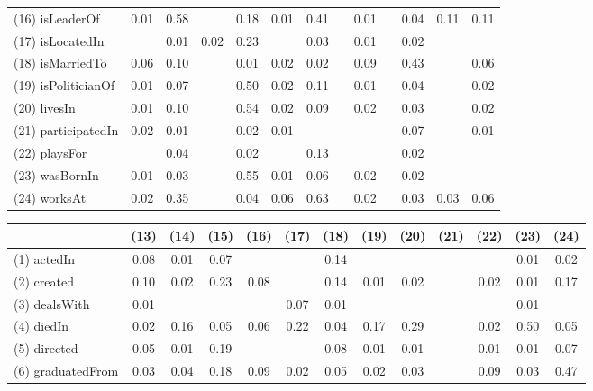 \begin{table}[t]
\begin{center}
\begin{tabular}{l||*{12}{c}}
            (16) isLeaderOf  & 0.01  & 0.58  &    & 0.18  & 0.01  & 0.41  &    & 0.01  &    & 0.04  & 0.11  & 0.11 \\
            (17) isLocatedIn  &    & 0.01  & 0.02  & 0.23  &    & 0.03  &    & 0.01  &    & 0.02  &    &   \\
            (18) isMarriedTo  & 0.06  & 0.10  &    & 0.01  & 0.02  & 0.02  &    & 0.09  &    & 0.43  &    & 0.06 \\
            (19) isPoliticianOf  & 0.01  & 0.07  &    & 0.50  & 0.02  & 0.11  &    & 0.01  &    & 0.04  &    & 0.02 \\
            (20) livesIn  & 0.01  & 0.10  &    & 0.54  & 0.02  & 0.09  &    & 0.02  &    & 0.03  &    & 0.02 \\
            (21) participatedIn  & 0.02  & 0.01  &    & 0.02  & 0.01  &    &    &    &    & 0.07  &    & 0.01 \\
            (22) playsFor  &    & 0.04  &    & 0.02  &    & 0.13  &    &    &    & 0.02  &    &   \\
            (23) wasBornIn  & 0.01  & 0.03  &    & 0.55  & 0.01  & 0.06  &    & 0.02  &    & 0.02  &    &   \\
            (24) worksAt  & 0.02  & 0.35  &    & 0.04  & 0.06  & 0.63  &    & 0.02  &    & 0.03  & 0.03  & 0.06 \\
        \end{tabular}
        \begin{tabular}{l||*{12}{c}}
                   & (13) & (14) & (15) & (16) & (17) & (18) & (19) & (20) & (21) & (22) & (23) & (24) \\
            \hline
            (1) actedIn  & 0.08  & 0.01  & 0.07  &    &    & 0.14  &    &    &    &    & 0.01  & 0.02 \\
            (2) created  & 0.10  & 0.02  & 0.23  & 0.08  &    & 0.14  & 0.01  & 0.02  &    & 0.02  & 0.01  & 0.17 \\
            (3) dealsWith  & 0.01  &    &    &    & 0.07  & 0.01  &    &    &    &    & 0.01  &   \\
            (4) diedIn  & 0.02  & 0.16  & 0.05  & 0.06  & 0.22  & 0.04  & 0.17  & 0.29  &    & 0.02  & 0.50  & 0.05 \\
            (5) directed  & 0.05  & 0.01  & 0.19  &    &    & 0.08  & 0.01  & 0.01  &    & 0.01  & 0.01  & 0.07 \\
            (6) graduatedFrom  & 0.03  & 0.04  & 0.18  & 0.09  & 0.02  & 0.05  & 0.02  & 0.03  &    & 0.09  & 0.03  & 0.47 \\

\end{tabular}
\end{center}
\end{table}
